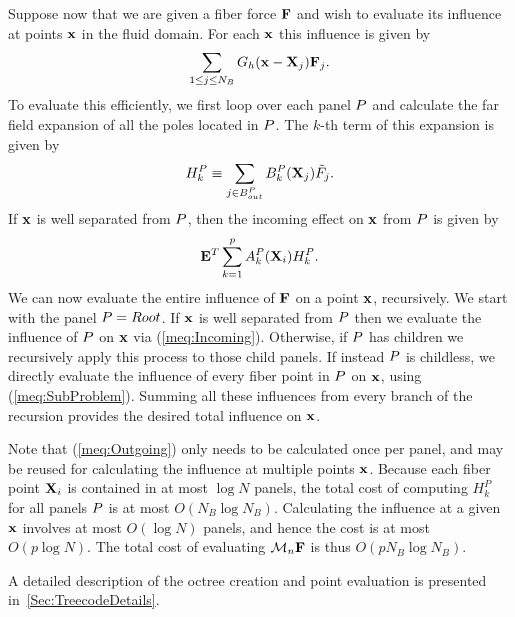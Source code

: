 Suppose now that we are given a fiber force $\mathbf{F}$ and wish to evaluate its influence at points $\mathbf{x}$ in the fluid domain. For each $\mathbf{x}$ this influence is given by
\begin{equation}
\sum_{1\leq j\leq N_B} G_h(\mathbf{x} - \mathbf{X}_j) \mathbf{F}_j.
\end{equation}
To evaluate this efficiently, we first loop over each panel $P$ and calculate the far field expansion of all the poles located in 
$P$. The $k$-th term of this expansion is given by
\begin{equation}
H_k^P \equiv \sum_{j\in B_{out}^P}
B_k^P(\mathbf{X}_j) \tilde{F}_j.
\label{meq:Outgoing}
\end{equation}
If $\mathbf{x}$ is well separated from $P$, then the incoming effect on $\mathbf{x}$ from $P$ is given by
\begin{equation}
\mathbf{E}^T \displaystyle\sum_{k=1}^{p}A_k^P(\mathbf{X}_i)H_k^P.
\label{meq:Incoming}
\end{equation}
We can now evaluate the entire influence of $\mathbf{F}$ on a point $\mathbf{x}$, recursively.   We start with the panel $P=Root$. If $\mathbf{x}$ is well separated from $P$ then we evaluate the influence of $P$ on $\mathbf{x}$ via (\ref{meq:Incoming}). Otherwise, if $P$ has children we recursively apply this process to those child panels. If instead $P$ is childless, we directly evaluate the influence of every fiber point in $P$ on $\mathbf{x}$, using (\ref{meq:SubProblem}). Summing all these influences from every branch of the recursion provides the desired total influence on $\mathbf{x}$.

Note that (\ref{meq:Outgoing}) only needs to be calculated once per panel, and may be reused for calculating the influence at multiple points $\mathbf{x}$. Because each fiber point $\mathbf{X}_i$ is contained in at most $\log N$ panels, the total cost of computing $H_k^P$ for all panels $P$ is at most $O(N_B\log N_B)$. Calculating the influence at a given $\mathbf{x}$ involves at most $O(\log N)$ panels, and hence the cost is at most $O(p\log N)$. The total cost of evaluating $\mathcal{M}_n\mathbf{F}$ is thus $O(pN_B\log N_B)$.

A detailed description of the octree creation and point evaluation is presented in~\ref{Sec:TreecodeDetails}.
